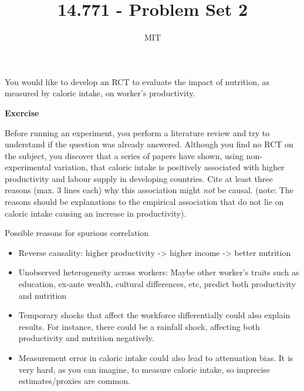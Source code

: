 \documentclass[10pt]{article}
\title{14.771 - Problem Set 2} %
\author{%
	\normalsize MIT \\ %
}
\date{} %
\newcounter{exercise}
\newenvironment{exercise}%
{%
	\refstepcounter{exercise}%
	\textbf{Exercise \theexercise}%
	}%
{
 \par\vspace{\baselineskip}%
\noindent\ignorespacesafterend
}
\begin{document}
\maketitle

You would like to develop an RCT to evaluate the impact of nutrition, as measured by caloric intake, on worker's productivity.

\begin{exercise}
	Before running an experiment, you perform a literature review and try to understand if the question was already answered. Although you find no RCT on the subject, you discover that a series of papers have shown, using non-experimental variation, that caloric intake is positively associated with higher productivity and labour supply in developing countries. Cite at least three reasons (max. 3 lines each) why this association might \textit{not} be causal. (note: The reasons should be explanations to the empirical association that do not lie on caloric intake causing an increase in productivity).
\end{exercise}

\color{red}
Possible reasons for spurious correlation
\begin{itemize}
	\item Reverse causality: higher productivity -> higher income -> better nutrition
	\item Unobserved heterogeneity across workers: Maybe other worker's traits such as education, ex-ante wealth, cultural differences, etc, predict both productivity and nutrition
	\item Temporary shocks that affect the workforce differentially could also explain results. For instance, there could be a rainfall shock, affecting both productivity and nutrition negatively.
	\item Measurement error in caloric intake could also lead to attenuation bias. It is very hard, as you can imagine, to measure caloric intake, so imprecise estimates/proxies are common.
\end{itemize}

\color{black}

\end{document}

